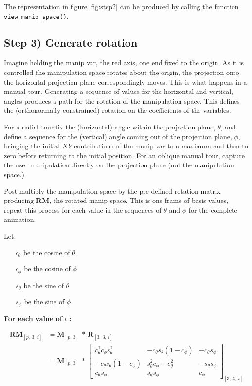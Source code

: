 The representation in figure \ref{fig:step2} can be produced by calling
the function \texttt{view\_manip\_space()}.

\hypertarget{step-3-generate-rotation}{%
\subsection{Step 3) Generate rotation}\label{step-3-generate-rotation}}

Imagine holding the manip var, the red axis, one end fixed to the
origin. As it is controlled the manipulation space rotates about the
origin, the projection onto the horizontal projection plane
correspondingly moves. This is what happens in a manual tour. Generating
a sequence of values for the horizontal and vertical, angles produces a
path for the rotation of the manipulation space. This defines the
(orthonormally-constrained) rotation on the coefficients of the
variables.

For a radial tour fix the (horizontal) angle within the projection
plane, \(\theta\), and define a sequence for the (vertical) angle coming
out of the projection plane, \(\phi\), bringing the initial \(XY\)
contributions of the manip var to a maximum and then to zero before
returning to the initial position. For an oblique manual tour, capture
the user manipulation directly on the projection plane (not the
manipulation space.)

Post-multiply the manipulation space by the pre-defined rotation matrix
producing \textbf{RM}, the rotated manip space. This is one frame of
basis values, repeat this process for each value in the sequences of
\(\theta\) and \(\phi\) for the complete animation.

Let:

\begin{itemize}
  \item[$c_\theta$] be the cosine of $\theta$
  \item[$c_\phi$]   be the cosine of $\phi$
  \item[$s_\theta$] be the sine of   $\theta$
  \item[$s_\phi$]   be the sine of   $\phi$
\end{itemize}

\textbf{For each value of } \(i\) \textbf{:}

\begin{align*}
  \textbf{RM}_{[p,~3,~i]}
  &= \textbf{M}_{[p,~3]} ~*~ \textbf{R}_{[3,~3,~i]} \\
  &= \textbf{M}_{[p,~3]}
    ~*~
  \begin{bmatrix}
    c_\theta^2 c_\phi s_\theta^2 &
    -c_\theta s_\theta (1 - c_\phi) &
    -c_\theta s_\phi \\
    -c_\theta s_\theta (1 - c_\phi) &
    s_\theta^2 c_\phi + c_\theta^2 &
    -s_\theta s_\phi \\
    c_\theta s_\phi &
    s_\theta s_\phi &
    c_\phi
  \end{bmatrix}_{[3,~3,~i]}
\end{align*}

